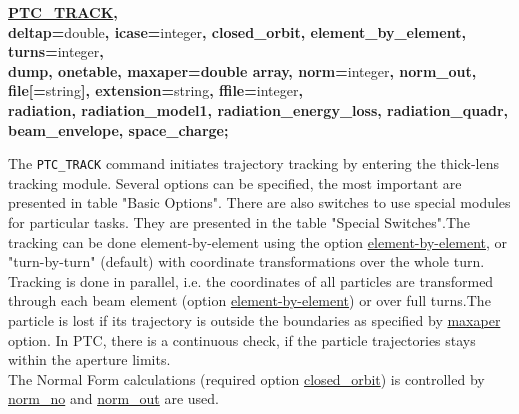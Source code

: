 \begin{description}
	\item {\textbf{\href{PTC_TRACK}{PTC\_TRACK}, 
\\ deltap=}double\textbf{, icase=}integer\textbf{, closed\_orbit, 
   element\_by\_element, turns=}integer\textbf{, 
\\ dump, onetable, maxaper=double array, norm=}integer\textbf{, 
   norm\_out, 
\\ file[=}string\textbf{], extension=}string\textbf{, ffile=}integer\textbf{,
\\ radiation, radiation\_model1, radiation\_energy\_loss, 
   radiation\_quadr,
\\ beam\_envelope, space\_charge;}}

	\item[Description] The \texttt{PTC\_TRACK} command initiates 
     trajectory tracking by entering the thick-lens tracking module. 
     Several options can be specified, the most important are 
     presented in table "Basic Options". There are also switches to 
     use special modules for particular tasks. They are presented in 
     the table "Special Switches".The tracking can be done element-by-element using the option
       \hyperlink{ELEMENT_BY_ELEMENT}{element-by-element}, or 
     "turn-by-turn" (default) with coordinate transformations over the whole 
     turn. Tracking 
     is done in parallel, i.e. the coordinates of all particles are 
     transformed through each beam element (option
       \hyperlink{ELEMENT_BY_ELEMENT}{element-by-element}) or 
       over full turns.The particle is lost if its trajectory is outside the boundaries 
       as specified by \hyperlink{MAXAPER}{maxaper} option. 
       In PTC, there is a continuous check, if the particle 
       trajectories stays within the aperture limits. 
\\
       The Normal Form calculations (required option
       \hyperlink{CLOSED_ORBIT}{closed\_orbit}) is controlled 
       by \hyperlink{NORM_NO}{norm\_no} and
       \hyperlink{NORM_OUT}{norm\_out} 
     are used.
	\item[Basic Options] 
	\text{ \\}	
		

\end{description}
